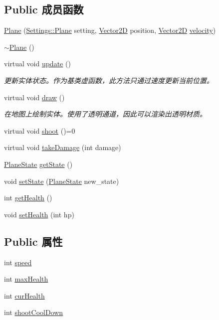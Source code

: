 \subsection*{Public 成员函数}
\begin{DoxyCompactItemize}
\item 
\hyperlink{class_plane_ab0729538ddb380ca9a5b501f4cf72714}{Plane} (\hyperlink{struct_settings_1_1_plane}{Settings\+::\+Plane} setting, \hyperlink{_vector2_d_8hpp_aa1f1145650f1dd9bddf7335ec6434d7c}{Vector2D} position, \hyperlink{_vector2_d_8hpp_aa1f1145650f1dd9bddf7335ec6434d7c}{Vector2D} \hyperlink{class_entity_a386d25b56772b8913eb3e5adc636f6e0}{velocity})
\item 
\hyperlink{class_plane_a69abd86051c880dcb44b249ad10c4436}{$\sim$\+Plane} ()
\item 
virtual void \hyperlink{class_plane_a7fbb07f76503fe057772e01f542afc32}{update} ()
\begin{DoxyCompactList}\small\item\em 更新实体状态。作为基类虚函数，此方法只通过速度更新当前位置。 \end{DoxyCompactList}\item 
virtual void \hyperlink{class_plane_a8877358878e91929c4c01bad40cbdb78}{draw} ()
\begin{DoxyCompactList}\small\item\em 在地图上绘制实体。使用了透明通道，因此可以渲染出透明材质。 \end{DoxyCompactList}\item 
virtual void \hyperlink{class_plane_af999499b5e79309d94004e8d012fe9c4}{shoot} ()=0
\item 
virtual void \hyperlink{class_plane_a1a93dbb00292aaae274c152079f5f6f3}{take\+Damage} (int damage)
\item 
\hyperlink{_plane_01-_01_bullet_8h_a9f852e2715e13ec145d551659d2813bc}{Plane\+State} \hyperlink{class_plane_a4b45bbcd85eb0ad999ab256f44b93fcc}{get\+State} ()
\item 
void \hyperlink{class_plane_a40cb32f3c42f1fc772be20448724d277}{set\+State} (\hyperlink{_plane_01-_01_bullet_8h_a9f852e2715e13ec145d551659d2813bc}{Plane\+State} new\+\_\+state)
\item 
int \hyperlink{class_plane_ad63d1e65ff9ca0d8b0ea1f6d37c55388}{get\+Health} ()
\item 
void \hyperlink{class_plane_a139404454150aac00b0f94b7f7d0d68e}{set\+Health} (int hp)
\end{DoxyCompactItemize}
\subsection*{Public 属性}
\begin{DoxyCompactItemize}
\item 
int \hyperlink{class_plane_a6ca15b26a453dfd4f81fa11a5ee278c9}{speed}
\item 
int \hyperlink{class_plane_ac39ded6721a8137c4a8044adfbfb8a6c}{max\+Health}
\item 
int \hyperlink{class_plane_a0434f35fe3f56acb865e51c042e43df8}{cur\+Health}
\item 
int \hyperlink{class_plane_ae9f4ab92b0aa75cff1f14df37980eabd}{shoot\+Cool\+Down}
\end{DoxyCompactItemize}
